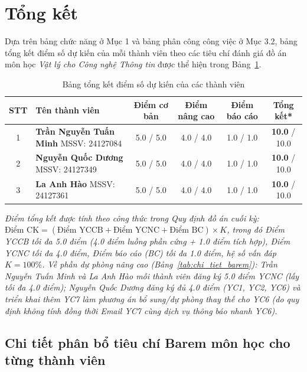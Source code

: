 \section{Tổng kết}

Dựa trên bảng chức năng ở Mục 1 và bảng phân công công việc ở Mục 3.2, bảng tổng kết điểm số dự kiến của mỗi thành viên theo các tiêu chí đánh giá đồ án môn học \textit{Vật lý cho Công nghệ Thông tin} được thể hiện trong Bảng~\ref{tab:tong_ket_diem}.

\begin{table}[H]
\centering
\setlength{\tabcolsep}{5pt}
\begin{tabularx}{\textwidth}{|c|X|c|c|c|c|}
\hline
\textbf{STT} & \textbf{Tên thành viên} & \textbf{Điểm cơ bản} & \textbf{Điểm nâng cao} & \textbf{Điểm báo cáo} & \textbf{Tổng kết*} \\ \hline
1 & \textbf{Trần Nguyễn Tuấn Minh} \newline \footnotesize MSSV: 24127084 & 5.0 / 5.0 & 4.0 / 4.0 & 1.0 / 1.0 & \textbf{10.0} / 10.0 \\ \hline
2 & \textbf{Nguyễn Quốc Dương} \newline \footnotesize MSSV: 24127349 & 5.0 / 5.0 & 4.0 / 4.0 & 1.0 / 1.0 & \textbf{10.0} / 10.0 \\ \hline
3 & \textbf{La Anh Hào} \newline \footnotesize MSSV: 24127361 & 5.0 / 5.0 & 4.0 / 4.0 & 1.0 / 1.0 & \textbf{10.0} / 10.0 \\ \hline
\end{tabularx}
\caption{Bảng tổng kết điểm số dự kiến của các thành viên}
\label{tab:tong_ket_diem}
\end{table}

\noindent \textit{\footnotesize * Điểm tổng kết được tính theo công thức trong Quy định đồ án cuối kỳ: $\text{Điểm CK} = (\text{Điểm YCCB} + \text{Điểm YCNC} + \text{Điểm BC}) \times K$, trong đó Điểm YCCB tối đa 5.0 điểm (4.0 điểm luồng phần cứng + 1.0 điểm tích hợp), Điểm YCNC tối đa 4.0 điểm, Điểm báo cáo (BC) tối đa 1.0 điểm, hệ số vấn đáp $K = 100\%$. Về phần dự phòng nâng cao (Bảng~\ref{tab:chi_tiet_barem}): Trần Nguyễn Tuấn Minh và La Anh Hào mỗi thành viên đăng ký 5.0 điểm YCNC (lấy tối đa 4.0 điểm); Nguyễn Quốc Dương đăng ký đủ 4.0 điểm (YC1, YC2, YC6) và triển khai thêm YC7 làm phương án bổ sung/dự phòng thay thế cho YC6 (do quy định không tính đồng thời Email YC7 cùng dịch vụ thông báo nhanh YC6).}

\newpage
\subsection{Chi tiết phân bổ tiêu chí Barem môn học cho từng thành viên}

